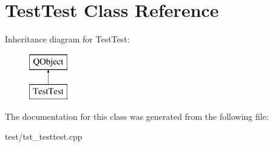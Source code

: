 \hypertarget{classTestTest}{\section{Test\-Test Class Reference}
\label{classTestTest}
}
Inheritance diagram for Test\-Test\-:\begin{figure}[H]
\begin{center}
\leavevmode
\includegraphics[height=2.000000cm]{classTestTest}
\end{center}
\end{figure}


The documentation for this class was generated from the following file\-:\begin{DoxyCompactItemize}
\item 
test/tst\-\_\-testtest.\-cpp\end{DoxyCompactItemize}
